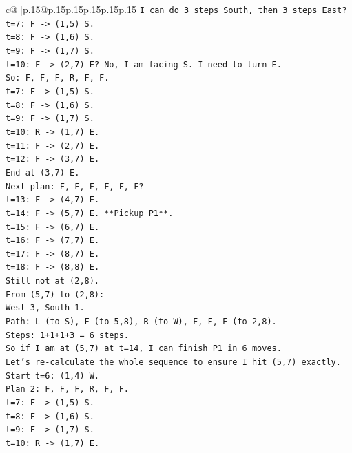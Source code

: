 \documentclass{article}
\begin{document}
{\begin{supertabular}{c@{$\;$}|p{.15\linewidth}@{}p{.15\linewidth}p{.15\linewidth}p{.15\linewidth}p{.15\linewidth}p{.15\linewidth}}
{{{\texttt{I can do 3 steps South, then 3 steps East?} \\
\texttt{t=7: F {-}> (1,5) S.} \\
\texttt{t=8: F {-}> (1,6) S.} \\
\texttt{t=9: F {-}> (1,7) S.} \\
\texttt{t=10: F {-}> (2,7) E? No, I am facing S. I need to turn E.} \\
\texttt{So: F, F, F, R, F, F.} \\
\texttt{t=7: F {-}> (1,5) S.} \\
\texttt{t=8: F {-}> (1,6) S.} \\
\texttt{t=9: F {-}> (1,7) S.} \\
\texttt{t=10: R {-}> (1,7) E.} \\
\texttt{t=11: F {-}> (2,7) E.} \\
\texttt{t=12: F {-}> (3,7) E.} \\
\texttt{End at (3,7) E.} \\
\texttt{Next plan: F, F, F, F, F, F?} \\
\texttt{t=13: F {-}> (4,7) E.} \\
\texttt{t=14: F {-}> (5,7) E. **Pickup P1**.} \\
\texttt{t=15: F {-}> (6,7) E.} \\
\texttt{t=16: F {-}> (7,7) E.} \\
\texttt{t=17: F {-}> (8,7) E.} \\
\texttt{t=18: F {-}> (8,8) E.} \\
\texttt{Still not at (2,8).} \\
\texttt{From (5,7) to (2,8):} \\
\texttt{West 3, South 1.} \\
\texttt{Path: L (to S), F (to 5,8), R (to W), F, F, F (to 2,8).} \\
\texttt{Steps: 1+1+1+3 = 6 steps.} \\
\texttt{So if I am at (5,7) at t=14, I can finish P1 in 6 moves.} \\
\texttt{Let's re{-}calculate the whole sequence to ensure I hit (5,7) exactly.} \\
\texttt{Start t=6: (1,4) W.} \\
\texttt{Plan 2: F, F, F, R, F, F.} \\
\texttt{t=7: F {-}> (1,5) S.} \\
\texttt{t=8: F {-}> (1,6) S.} \\
\texttt{t=9: F {-}> (1,7) S.} \\
\texttt{t=10: R {-}> (1,7) E.} \\
}}}
\end{supertabular}}
\end{document}
